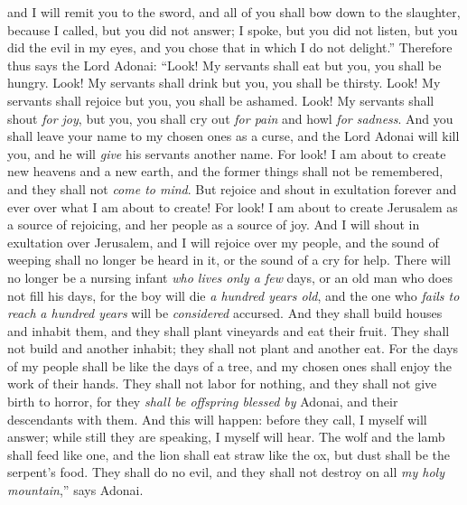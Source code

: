 \begin{biblechapter}
\verse and I will remit you to the sword, 
and all of you shall bow down to the slaughter, 
because I called, but you did not answer; 
I spoke, but you did not listen, 
but you did the evil in my eyes, 
and you chose that in which I do not delight.”
\verse Therefore thus says the Lord Adonai:
\verse “Look! My servants shall eat but you, you shall be hungry. 
Look! My servants shall drink but you, you shall be thirsty. 
Look! My servants shall rejoice but you, you shall be ashamed.
\verse Look! My servants shall shout \textit{for joy}, but you, you shall cry out \textit{for pain} and howl \textit{for sadness}.
\verse And you shall leave your name to my chosen ones as a curse, 
and the Lord Adonai will kill you, and he will \textit{give} his servants another name.
 For look! I am about to create new heavens and a new earth, 
and the former things shall not be remembered, 
and they shall not \textit{come to mind}.
\verse But rejoice and shout in exultation forever and ever over what I am about to create! 
For look! I am about to create Jerusalem as a source of rejoicing, 
and her people as a source of joy.
\verse And I will shout in exultation over Jerusalem, 
and I will rejoice over my people, 
and the sound of weeping shall no longer be heard in it, 
or the sound of a cry for help.
\verse There will no longer be a nursing infant \textit{who lives only a few} days, 
or an old man who does not fill his days, 
for the boy will die \textit{a hundred years old}, 
and the one who \textit{fails to reach} \textit{a hundred years} will be \textit{considered} accursed.
\verse And they shall build houses and inhabit them, 
and they shall plant vineyards and eat their fruit.
\verse They shall not build and another inhabit; 
they shall not plant and another eat. 
For the days of my people shall be like the days of a tree, 
and my chosen ones shall enjoy the work of their hands.
\verse They shall not labor for nothing, 
and they shall not give birth to horror, 
for they \textit{shall be offspring blessed by} Adonai, 
and their descendants with them.
\verse And this will happen: before they call, I myself will answer; 
while still they are speaking, I myself will hear.
\verse The wolf and the lamb shall feed like one, 
and the lion shall eat straw like the ox, 
but dust shall be the serpent’s food. 
They shall do no evil, 
and they shall not destroy on all \textit{my holy mountain},” says Adonai.
\end{biblechapter}

